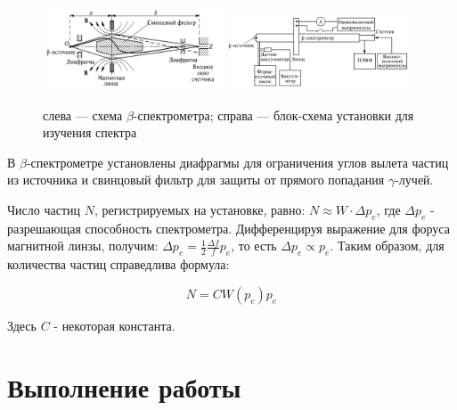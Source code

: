 \documentclass[a4paper, 12pt]{article}%
\begin{document}
	\begin{figure}[h]
	\centering
	\includegraphics[width=0.48\textwidth]{lab}
	\hfill
	\includegraphics[width=0.48\textwidth]{lab2}
	\caption{слева --- схема $\beta$-спектрометра; справа --- блок-схема установки для изучения спектра}
	\label{pic:scheme}
\end{figure}

В $\beta$-спектрометре установлены диафрагмы для ограничения углов вылета частиц из источника и свинцовый фильтр для защиты от прямого попадания $\gamma$-лучей. 

Число частиц $N$, регистрируемых на установке, равно: $N \approx W \cdot \Delta p_e$, где $\Delta p_e$ - разрешающая способность спектрометра. Дифференцируя выражение для форуса магнитной линзы, получим: $\Delta p_e = \frac{1}{2}\frac{\Delta f}{f}p_e$, то есть $\Delta p_e \propto p_e$. Таким образом, для количества частиц справедлива формула: 

\begin{equation}\label{N}
 N = CW(p_e)p_e 
\end{equation}

Здесь $C$ - некоторая константа.

\section{Выполнение работы}
\end{document}
